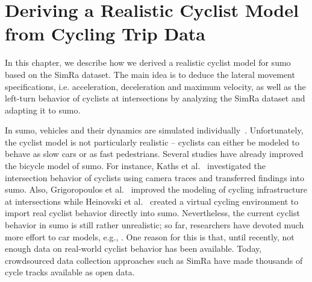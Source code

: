 \chapter{Deriving a Realistic Cyclist Model from Cycling Trip Data}
\label{cha:sumo}
In this chapter, we describe how we derived a realistic cyclist model for \ac{sumo} based on the SimRa dataset.
The main idea is to deduce the lateral movement specifications, i.e. acceleration, deceleration and maximum velocity, as well as the left-turn behavior of cyclists at intersections by analyzing the SimRa dataset and adapting it to \ac{sumo}.

In \ac{sumo}, vehicles and their dynamics are simulated individually~\cite{lopez2018microscopic}.
Unfortunately, the cyclist model is not particularly realistic -- cyclists can either be modeled to behave as slow cars or as fast pedestrians.
Several studies have already improved the bicycle model of \ac{sumo}.
For instance, Kaths et al.~\cite{kaths2016integration} investigated the intersection behavior of cyclists using camera traces and transferred findings into \ac{sumo}.
Also, Grigoropoulos et al.~\cite{grigoropoulos2019modelling} improved the modeling of cycling infrastructure at intersections while Heinovski et al.~\cite{heinovski2019modeling} created a virtual cycling environment to import real cyclist behavior directly into \ac{sumo}.
Nevertheless, the current cyclist behavior in \ac{sumo} is still rather unrealistic; so far, researchers have devoted much more effort to car models, e.g., \cite{chandler1958traffic,gazis1961nonlinear,gipps1981behavioural, leutzbach1986development,bando1995dynamical,krauss1998microscopic,treiber2000congested,salles2020extending}.
One reason for this is that, until recently, not enough data on real-world cyclist behavior has been available.
Today, crowdsourced data collection approaches such as SimRa have made thousands of cycle tracks available as open data.


